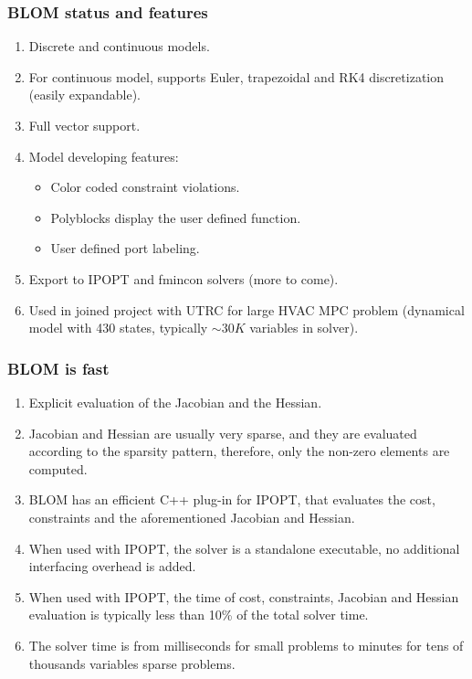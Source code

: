 \documentclass[mathserif]{beamer}
\begin{document}
\begin{frame}
\frametitle{BLOM status and features}
\begin{enumerate}
\item Discrete and continuous models.
\item For continuous model, supports Euler, trapezoidal and RK4 discretization
  (easily expandable).
\item Full vector support.
\item Model developing features: 
\begin{itemize}
\item Color coded constraint violations.
\item Polyblocks display the user defined function.
\item User defined port labeling. 
\end{itemize}
\item Export to IPOPT and fmincon solvers (more to come).
\item Used in joined project with UTRC for large HVAC MPC problem (dynamical
  model with 430 states, typically $\sim30K$ variables in solver). 
\end{enumerate}
\end{frame}

\begin{frame}
\frametitle{BLOM is fast}
\begin{enumerate}
\item Explicit evaluation of the Jacobian and the Hessian. 
\item Jacobian and Hessian are usually very sparse, and they are evaluated according to the sparsity pattern, therefore, only the non-zero elements are computed.
\item BLOM has an efficient C++ plug-in for IPOPT, that evaluates the cost, constraints and the aforementioned Jacobian and Hessian.
\item When used with IPOPT, the solver is a standalone executable, no additional interfacing overhead is added.   
\item When used with IPOPT, the time of cost, constraints, Jacobian and Hessian evaluation is typically less than 10\% of the total solver time. 
\item The solver time is from  milliseconds for small problems to  minutes for tens of thousands variables sparse problems.
\end{enumerate}
\end{frame}
\end{document}
